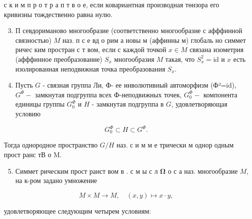 \documentclass[10pt]{article}
\begin{document}
с к и м п р о т р а п т в о е, если ковариантная производная төнзора его кривизны тождественно равна нулю.



\begin{enumerate}

  \setcounter{enumi}{2}

  \item П севдориманово многообразие (соответственно многообразие с афффинной связностью) $M$ наз. п с е вд о рим а новы м (аффинны м) глобаль но симмет ричес ким простран с т вом, если с каждой точкой $x \in M$ связана изометрия (афффинное преобразование) $S_{x}$ многообразия $M$ такая, что $S_{x}^{2}=\mathrm{id}$ и $x$ есть изолированная неподвижная точка преобразования $S_{x}$.



  \item Пусть $G$ - связная группа Ли, Ф- ее инволютивный автоморфизм (Ф²=id), $G^{\Phi}-$ замкнутая подгруппа всех Ф-неподвижных точек, $G_{0}^{\Phi}-$ компонента единицы группы $G_{0}^{\Phi}$ и $H$ - замкнутая подгруппа в $G$, удовлетворяющая условию



\end{enumerate}



\[

G_{0}^{\Phi} \subset H \subset G^{\Phi} .

\]



Тогда однородное пространство $G / H$ наз. с и м м е трически м однор одным прост ранс тВ $о$ M.



\begin{enumerate}

  \setcounter{enumi}{4}

  \item Симмет рическим прост ранст вом в . с м ы с л $\boldsymbol{\Omega}$ о с а наз. многообразие $M$, на к-ром задано умножение

\end{enumerate}



\[

M \times M \longrightarrow M, \quad(x, y) \longmapsto x \cdot y,

\]



удовлетворяющее следующим четырем условиям:
\end{document}
